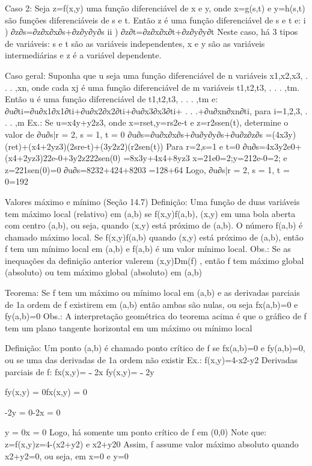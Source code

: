 {{{Caso 2:
    Seja z=f(x,y) uma função diferenciável de x e y, onde x=g(s,t) e y=h(s,t) são funções diferenciáveis de s e t. Então z é uma função diferenciável de s e t e:
        i ) ∂z∂s=∂z∂x∂x∂s+∂z∂y∂y∂s
        ii ) ∂z∂t=∂z∂x∂x∂t+∂z∂y∂y∂t
    Neste caso, há 3 tipos de variáveis: s e t são as variáveis independentes, x e y são as variáveis intermediárias e z é a variável dependente.



Caso geral:
    Suponha que u seja uma função diferenciável de n variáveis x1,x2,x3, . . . ,xn, onde cada xj é uma função diferenciável de m variáveis t1,t2,t3, . . . ,tm. Então u é uma função diferenciável de t1,t2,t3, . . . ,tm e:
        ∂u∂ti=∂u∂x1∂x1∂ti+∂u∂x2∂x2∂ti+∂u∂x3∂x3∂ti+ . . .+∂u∂xn∂xn∂ti, para i=1,2,3, . . . ,m
    Ex.: Se u=x4y+y2z3, onde x=rset,y=rs2e-t e z=r2ssen(t), determine o valor de
            ∂u∂s|r = 2, s = 1, t = 0
            ∂u∂s=∂u∂x∂x∂s+∂u∂y∂y∂s+∂u∂z∂z∂s
                =(4x3y)(ret)+(x4+2yz3)(2sre-t)+(3y2z2)(r2sen(t))
            Para r=2,s=1 e t=0
            ∂u∂s=4x3y2e0+(x4+2yz3)22e-0+3y2z222sen(0)
                =8x3y+4x4+8yz3
            x=21e0=2;y=212e-0=2; e z=221sen(0)=0
            ∂u∂s=8232+424+8203
                =128+64
            Logo, ∂u∂s|r = 2, s = 1, t = 0=192

Valores máximo e mínimo (Seção 14.7)
Definição:
    Uma função de duas variáveis tem máximo local (relativo) em (a,b) se f(x,y)f(a,b), (x,y) em uma bola aberta com centro (a,b), ou seja, quando (x,y) está próximo de (a,b). O número f(a,b) é chamado máximo local.
    Se f(x,y)f(a,b) quando (x,y) está próximo de (a,b), então f tem um mínimo local em (a,b) e f(a,b) é um valor mínimo local.
    Obs.: Se as inequações da definição anterior valerem (x,y)Dm(f) , então f tem máximo global (absoluto) ou tem máximo global (absoluto) em (a,b)

Teorema:
    Se f tem um máximo ou mínimo local em (a,b) e as derivadas parciais de 1a ordem de f existirem em (a,b) então ambas são nulas, ou seja fx(a,b)=0 e fy(a,b)=0
Obs.: A interpretação geométrica do teorema acima é que o gráfico de  f tem um plano tangente horizontal em um máximo ou mínimo local

    




Definição:
    Um ponto (a,b) é chamado ponto crítico de f se fx(a,b)=0 e fy(a,b)=0, ou se uma das derivadas de 1a ordem não existir
    Ex.: f(x,y)=4-x2-y2
            Derivadas parciais de f:
                fx(x,y)=﹣2x
                fy(x,y)=﹣2y
            {fy(x,y) = 0fx(x,y) = 0{-2y = 0-2x = 0{y = 0x = 0
            Logo, há somente um ponto crítico de f em (0,0)
        Note que:
            z=f(x,y)z=4-(x2+y2) e x2+y20
        Assim, f assume valor máximo absoluto quando x2+y2=0, ou seja, em x=0 e y=0

}}}}}}
